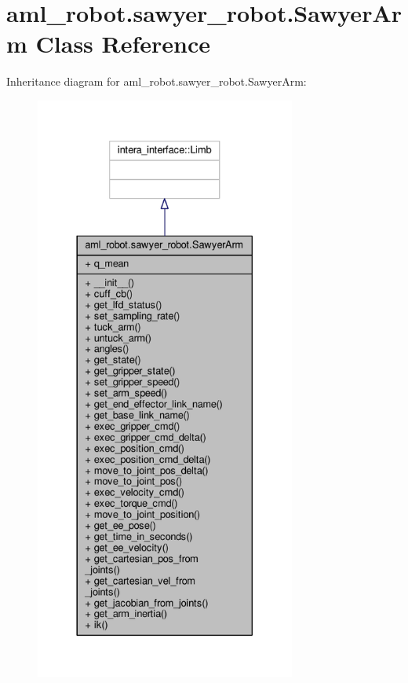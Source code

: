 \hypertarget{classaml__robot_1_1sawyer__robot_1_1_sawyer_arm}{\section{aml\-\_\-robot.\-sawyer\-\_\-robot.\-Sawyer\-Arm Class Reference}
\label{classaml__robot_1_1sawyer__robot_1_1_sawyer_arm}
}


Inheritance diagram for aml\-\_\-robot.\-sawyer\-\_\-robot.\-Sawyer\-Arm\-:\nopagebreak
\begin{figure}[H]
\begin{center}
\leavevmode
\includegraphics[height=550pt]{classaml__robot_1_1sawyer__robot_1_1_sawyer_arm__inherit__graph}
\end{center}
\end{figure}


